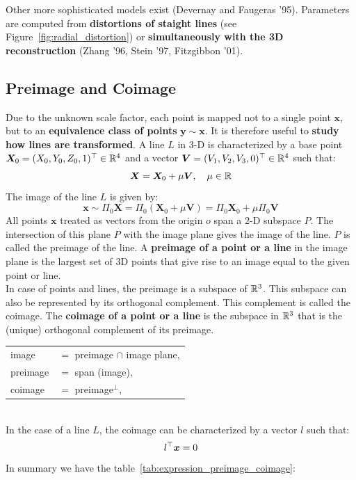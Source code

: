 Other more sophisticated models exist (Devernay and Faugeras '95).
Parameters are computed from
\textbf{distortions of staight lines} (see Figure~\ref{fig:radial_distortion})
or \textbf{simultaneously with the 3D reconstruction}
(Zhang '96, Stein '97, Fitzgibbon '01).


\subsection{Preimage and Coimage}%
\label{sub:preimage_and_coimage}


Due to the unknown scale factor, each point is mapped not to a single
point $\bm{x}$, but to an \textbf{equivalence class of points} $\bm{ y \sim x}$.
It is therefore useful to \textbf{study how lines are transformed}.
A line $L$ in 3-D is characterized by a base point
$\bm{X}_0 = (X_0, Y_0, Z_0, 1)^{\top} \in \mathbb{R}^4$ and a vector
$\bm{V} = (V_1, V_2, V_3, 0)^{\top} \in \mathbb{R}^4$ such that:
\[
	\bm{X} = \bm{X}_0 + \mu \bm{V}, \quad \mu \in \mathbb{R}
\]
The image of the line $L$ is given by:
\[
	\bm{x} \sim \Pi_0 \bm{X}
	= \Pi_0 ( \bm{X}_0 + \mu \bm{V} )
	= \Pi_0 \bm{X}_0 + \mu \Pi_0 \bm{V}
\]
All points $\bm{x}$ treated as vectors from the origin $o$ span a 2-D
subspace $P$. The intersection of this plane $P$ with the image plane
gives the image of the line.
$P$ is called the preimage of the line.
A \textbf{preimage of a point or a line} in the image plane
is the largest set of 3D points that give rise to an image
equal to the given point or line.\\

In case of points and lines, the preimage is a subspace of $\mathbb{R}^3$.
This subspace can also be represented by its orthogonal complement.
This complement is called the coimage.
The \textbf{coimage of a point or a line} is the subspace in $\mathbb{R}^3$
that is the (unique) orthogonal complement of its preimage.\\

\begin{tabular}{ll}
	image &$=$ preimage $\cap$ image plane,\\
	preimage &$=$ span (image),\\
	coimage &$=$ preimage$^{\bot}$,\\
\end{tabular}\\[1em]

In the case of a line $L$, the coimage can be characterized by
a vector $l$ such that:
\[
	l^{\top} \bm{x} = 0
\]
In summary we have the table~\ref{tab:expression_preimage_coimage}:

